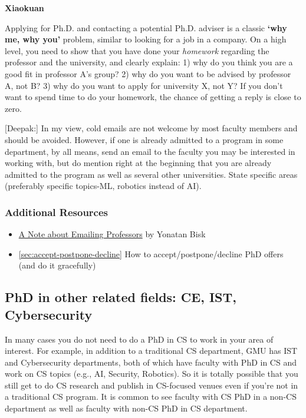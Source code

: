 \documentclass[oneside,11pt,dvipsnames]{book}
\newenvironment{commentbox}[1][]{
  \small
  \begin{mybox}
    {\small \textbf{#1}}
  }{
  \end{mybox}
}
\begin{document}
\begin{commentbox}[Xiaokuan]
  Applying for Ph.D. and contacting a potential Ph.D. adviser is a classic \textbf{`why me, why you'} problem,
  similar to looking for a job in a company.
  On a high level,
  you need to show that you have done your \emph{homework}
  regarding the professor and the university,
  and clearly explain:
  1) why do you think you are a good fit in professor A's group?
  2) why do you want to be advised by professor A, not B?
  3) why do you want to apply for university X, not Y?
  If you don't want to spend time to do your homework,
  the chance of getting a reply is close to zero.
\end{commentbox}


\begin{commentbox}
  [Deepak:]
  In my view, cold emails are not welcome by most faculty members and should be avoided. However, if one is already admitted to a program in some department, by all means, send an email to the faculty you may be interested in working with, but do mention right at the beginning that you are already admitted to the program as well as several other universities. State specific areas (preferably specific topics-ML, robotics instead of AI).
\end{commentbox}

\subsubsection*{Additional Resources}
\begin{itemize}
  \item \href{https://yonatanbisk.com/emailing_professors.html}{A Note about Emailing Professors} by Yonatan Bisk
  \item \autoref{sec:accept-postpone-decline} How to accept/postpone/decline PhD offers (and do it gracefully)
\end{itemize}

\subsection{PhD in other related fields: CE, IST, Cybersecurity}\label{sec:related-fields}

In many cases you do not need to do a PhD in CS to work in your area of interest. For example, in addition to a traditional CS department, GMU has IST and Cybersecurity departments, both of which have faculty  with PhD in CS and work on CS topics (e.g., AI, Security, Robotics).  So it is totally possible that you still get to do CS research and publish in CS-focused venues even if you're not in a traditional CS program.  It is  common to see faculty with CS PhD in a non-CS department as well as faculty with non-CS PhD in CS department.
\end{document}
